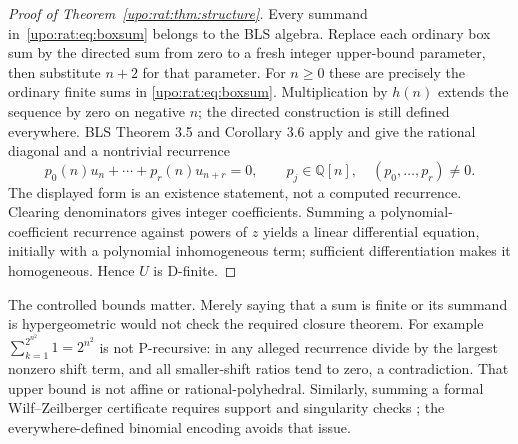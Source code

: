 \documentclass[11pt,letterpaper]{article}
\theoremstyle{remark}\newtheorem{remark}[theorem]{Remark}
\numberwithin{equation}{section}
\begin{document}
\begin{proof}[Proof of Theorem~\ref{upo:rat:thm:structure}]
Every summand in~\eqref{upo:rat:eq:boxsum} belongs to the BLS algebra. Replace
each ordinary box sum by the directed sum from zero to a fresh integer
upper-bound parameter, then substitute $n+2$ for that parameter.
For $n\ge0$ these are precisely the ordinary finite sums in
\eqref{upo:rat:eq:boxsum}. Multiplication by $h(n)$ extends the sequence by zero
on negative $n$; the directed construction is still defined everywhere.
BLS Theorem 3.5 and Corollary 3.6 apply and give the rational diagonal and
a nontrivial recurrence
\[
p_0(n)u_n+\cdots+p_r(n)u_{n+r}=0,
\qquad p_j\in\mathbb Q[n],\quad (p_0,\ldots,p_r)\ne0.
\]
The displayed form is an existence statement, not a computed recurrence.
Clearing denominators gives integer coefficients. Summing a
polynomial-coefficient recurrence against powers of $z$ yields a linear
differential equation, initially with a polynomial inhomogeneous term;
sufficient differentiation makes it homogeneous. Hence $U$ is D-finite.
\end{proof}

The controlled bounds matter. Merely saying that a sum is finite or its
summand is hypergeometric would not check the required closure theorem.
For example $\sum_{k=1}^{2^{n^2}}1=2^{n^2}$ is not P-recursive: in any
alleged recurrence divide by the largest nonzero shift term, and all
smaller-shift ratios tend to zero, a contradiction. That upper bound is
not affine or rational-polyhedral. Similarly, summing a formal
Wilf--Zeilberger certificate requires support and singularity checks
\cite{WZ}; the everywhere-defined binomial encoding avoids that issue.
\end{document}
